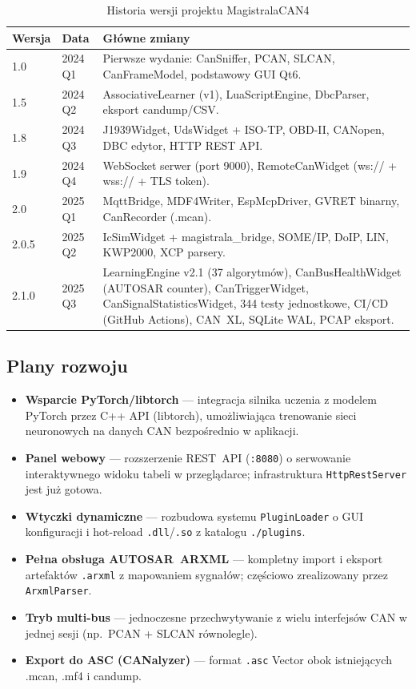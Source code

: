 \documentclass[12pt, a4paper]{article}
\begin{document}
\begin{table}[H]
\caption{Historia wersji projektu MagistralaCAN4}
\label{tab:changelog}
\centering
\small
\begin{tabular}{p{1.8cm}p{2.8cm}p{9.8cm}}
\toprule
\textbf{Wersja} & \textbf{Data} & \textbf{Główne zmiany} \\
\midrule
1.0 & 2024 Q1 &
  Pierwsze wydanie: CanSniffer, PCAN, SLCAN, CanFrameModel, podstawowy GUI Qt6. \\
1.5 & 2024 Q2 &
  AssociativeLearner (v1), LuaScriptEngine, DbcParser, eksport candump/CSV. \\
1.8 & 2024 Q3 &
  J1939Widget, UdsWidget + ISO-TP, OBD-II, CANopen, DBC edytor, HTTP REST API. \\
1.9 & 2024 Q4 &
  WebSocket serwer (port 9000), RemoteCanWidget (ws:// + wss:// + TLS token). \\
2.0 & 2025 Q1 &
  MqttBridge, MDF4Writer, EspMcpDriver, GVRET binarny, CanRecorder (.mcan). \\
2.0.5 & 2025 Q2 &
  IcSimWidget + magistrala\_bridge, SOME/IP, DoIP, LIN, KWP2000, XCP parsery. \\
2.1.0 & 2025 Q3 &
  LearningEngine v2.1 (37 algorytmów), CanBusHealthWidget (AUTOSAR counter),
  CanTriggerWidget, CanSignalStatisticsWidget, 344 testy jednostkowe, CI/CD
  (GitHub Actions), CAN~XL, SQLite WAL, PCAP eksport. \\
\bottomrule
\end{tabular}
\end{table}

\subsection{Plany rozwoju}

\begin{itemize}
  \item \textbf{Wsparcie PyTorch/libtorch} --- integracja silnika uczenia
        z modelem PyTorch przez C++ API (libtorch), umożliwiająca
        trenowanie sieci neuronowych na danych CAN bezpośrednio w aplikacji.
  \item \textbf{Panel webowy} --- rozszerzenie REST~API (\texttt{:8080})
        o serwowanie interaktywnego widoku tabeli w przeglądarce;
        infrastruktura \texttt{HttpRestServer} jest już gotowa.
  \item \textbf{Wtyczki dynamiczne} --- rozbudowa systemu \texttt{PluginLoader}
        o GUI konfiguracji i hot-reload \texttt{.dll}/\texttt{.so}
        z katalogu \texttt{./plugins}.
  \item \textbf{Pełna obsługa AUTOSAR~ARXML} --- kompletny import i eksport
        artefaktów \texttt{.arxml} z mapowaniem sygnałów;
        częściowo zrealizowany przez \texttt{ArxmlParser}.
  \item \textbf{Tryb multi-bus} --- jednoczesne przechwytywanie z wielu
        interfejsów CAN w jednej sesji (np.\ PCAN + SLCAN równolegle).
  \item \textbf{Export do ASC (CANalyzer)} --- format \texttt{.asc} Vector
        obok istniejących .mcan, .mf4 i candump.
\end{itemize}
\end{document}
